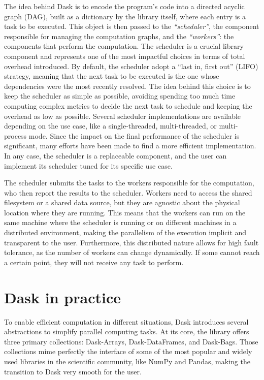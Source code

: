The idea behind Dask is to encode the program's code into a directed acyclic
graph (DAG), built as a dictionary by the library itself, where each entry is a
task to be executed.
This object is then passed to the \textit{``scheduler''}, the component
responsible for managing the computation graphs, and the \textit{``workers''}:
the components that perform the computation.
The scheduler is a crucial library component and represents one of the most
impactful choices in terms of total overhead introduced.
By default, the scheduler adopt a ``last in, first out'' (LIFO) strategy,
meaning that the next task to be executed is the one whose dependencies were the
most recently resolved.
The idea behind this choice is to keep the scheduler as simple as possible,
avoiding spending too much time computing complex metrics to decide the next
task to schedule and keeping the overhead as low as possible.
Several scheduler implementations are available depending on the use case, like
a single-threaded, multi-threaded, or multi-process mode.
Since the impact on the final performance of the scheduler is significant, many
efforts have been made to find a more efficient implementation\cite{bohm2020}.
In any case, the scheduler is a replaceable component, and the user can
implement its scheduler tuned for its specific use case.

The scheduler submits the tasks to the workers responsible for the computation,
who then report the results to the scheduler.
Workers need to access the shared filesystem or a shared data source, but they
are agnostic about the physical location where they are running.
This means that the workers can run on the same machine where the scheduler is
running or on different machines in a distributed environment, making the
parallelism of the execution implicit and transparent to the user.
Furthermore, this distributed nature allows for high fault tolerance, as the
number of workers can change dynamically.
If some cannot reach a certain point, they will not receive any task to perform.

\section{Dask in practice}\label{sec:daskcloud}

To enable efficient computation in different situations, Dask introduces several
abstractions to simplify parallel computing tasks.
At its core, the library offers three primary collections: Dask-Arrays,
Dask-DataFrames, and Dask-Bags.
Those collections mime perfectly the interface of some of the most popular and
widely used libraries in the scientific community, like NumPy and Pandas, making
the transition to Dask very smooth for the user.

